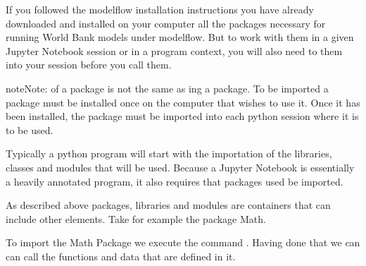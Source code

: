 \documentclass[letterpaper,10pt,english]{jupyterBook}
\begin{document}
\sphinxAtStartPar
If you followed the modelflow installation instructions you have already downloaded and installed on your computer all the packages necessary for running World Bank models under modelflow.  But to work with them in a given Jupyter Notebook session or in a program context, you will also need to  them into your session before you call them.

\begin{sphinxadmonition}{note}{Note:}
\sphinxAtStartPar
{} of a package is not the same as ing a package. To be imported a package must be installed once on the computer that wishes to use it.  Once it has been installed, the package must be imported into each python session where it is to be used.
\end{sphinxadmonition}

\sphinxAtStartPar
Typically a python program will start with the importation of the libraries, classes and modules that will be used.  Because a Jupyter Notebook is essentially a heavily annotated program, it also requires that packages used be imported.

\sphinxAtStartPar
As described above packages, libraries and modules are containers that can include other elements.  Take for example the package Math.

\sphinxAtStartPar
To import the Math Package we execute the command .  Having done that we can can call the functions and data that are defined in it.
\end{document}
